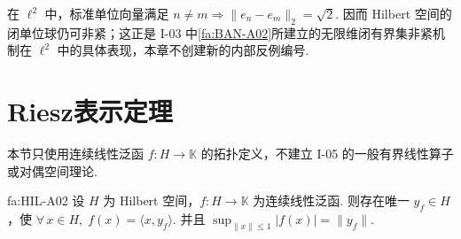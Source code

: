 \begin{FARemark}[无限维闭单位球非紧性沿用I-03]
在 \(\displaystyle \ell^2\) 中，标准单位向量满足 \(\displaystyle n\neq m\Rightarrow\|e_n-e_m\|_2=\sqrt2\). 因而 Hilbert 空间的闭单位球仍可非紧；这正是 I-03 中\autoref{fa:BAN-A02}所建立的无限维闭有界集非紧机制在 \(\displaystyle \ell^2\) 中的具体表现，本章不创建新的内部反例编号.
\end{FARemark}

\section{Riesz表示定理}\label{sec:i04-riesz-representation}

本节只使用连续线性泛函 \(\displaystyle f:H\to\mathbb K\) 的拓扑定义，不建立 I-05 的一般有界线性算子或对偶空间理论.

\begin{FATheorem}[A][Hilbert空间Riesz表示定理]{fa:HIL-A02}
设 \(\displaystyle H\) 为 Hilbert 空间，\(\displaystyle f:H\to\mathbb K\) 为连续线性泛函. 则存在唯一 \(\displaystyle y_f\in H\)，使 \(\displaystyle \forall\,x\in H,\; f(x)=\langle x,y_f\rangle\).
并且 \(\displaystyle \sup_{\|x\|\leqslant1}|f(x)|=\|y_f\|\).
\end{FATheorem}

